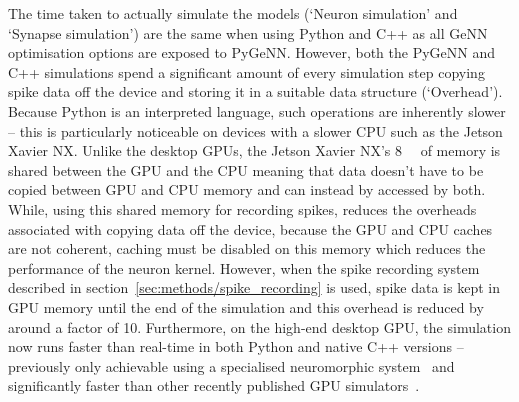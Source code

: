 \documentclass[utf8]{frontiersSCNS} %
\begin{document}
The time taken to actually simulate the models (`Neuron simulation' and `Synapse simulation') are the same when using Python and C++ as all GeNN optimisation options are exposed to PyGeNN.
However, both the PyGeNN and C++ simulations spend a significant amount of every simulation step copying spike data off the device and storing it in a suitable data structure (`Overhead').
Because Python is an interpreted language, such operations are inherently slower -- this is particularly noticeable on devices with a slower CPU such as the Jetson Xavier NX.
Unlike the desktop GPUs, the Jetson Xavier NX's \SI{8}{\giga\byte} of memory is shared between the GPU and the CPU meaning that data doesn't have to be copied between GPU and CPU memory and can instead by accessed by both.
While, using this shared memory for recording spikes, reduces the overheads associated with copying data off the device, because the GPU and CPU caches are not coherent, caching must be disabled on this memory which reduces the performance of the neuron kernel.
However, when the spike recording system described in section~\ref{sec:methods/spike_recording} is used, spike data is kept in GPU memory until the end of the simulation and this overhead is reduced by around a factor of 10.
Furthermore, on the high-end desktop GPU, the simulation now runs faster than real-time in both Python and native C++ versions -- previously only achievable using a specialised neuromorphic system~\citep{Rhodes2019} and significantly faster than other recently published GPU simulators~\citep{Golosio2020}.
%
\end{document}
